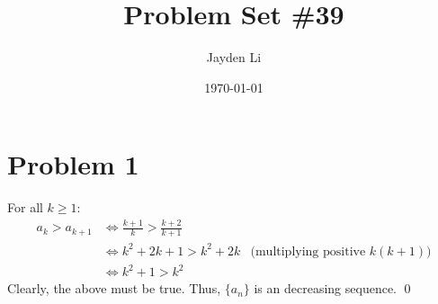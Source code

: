 \documentclass[preview, margin=0.6in]{standalone}
\title{\vspace*{-30pt}Problem Set \#39}
\author{Jayden Li}
\date{\today}
\newcommand*{\problem}[1]{\section*{Problem #1}}
\begin{document}
\fontsize{12pt}{12pt}\selectfont
\setlength{\abovedisplayskip}{\abovedisplayskip / 2}
\setlength{\belowdisplayskip}{\belowdisplayskip / 2}
\setlength{\parindent}{0pt}
\setlength{\parskip}{2ex plus 0.5ex minus 0.2ex}
\maketitle

\problem{1}
For all $k\geq 1$:
\begin{align*}
	a_k>a_{k+1}
	&\iff \frac{k+1}{k}>\frac{k+2}{k+1} \\
	&\iff k^2+2k+1>k^2+2k
	& \text{(multiplying positive $k(k+1)$)} \\
	&\iff k^2+1>k^2
\end{align*}
Clearly, the above must be true. Thus, $\{a_n\}$ is an decreasing sequence. \qed
\end{document}
